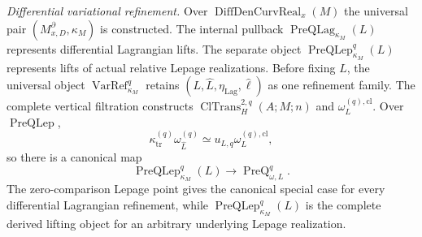 \begin{theorem}
\medskip
\noindent\emph{Differential variational refinement.}
Over $\operatorname{DiffDenCurvReal}_x(M)$ the universal pair
$(M^\partial_{x,D},\kappa_M)$ is constructed.  The internal pullback
$\operatorname{PreQLag}_{\kappa_M}(L)$ represents differential Lagrangian lifts.
The separate object $\operatorname{PreQLep}_{\kappa_M}^{q}(L)$ represents lifts
of actual relative Lepage realizations.  Before fixing $L$, the universal object
$\operatorname{VarRef}_{\kappa_M}^{q}$ retains
$(L,\widehat L,\eta_{\mathrm{Lag}},\widehat\ell)$ as one refinement family.  The complete vertical filtration
constructs
$\operatorname{ClTrans}^{2,q}_H(A;M;n)$ and
$\omega_L^{(q),\mathrm{cl}}$.  Over $\operatorname{PreQLep}$,
\[
\kappa_{\mathrm{tr}}^{(q)}\omega_{\widehat L}^{(q)}
\simeq
u_{L,q}\omega_L^{(q),\mathrm{cl}},
\]
so there is a canonical map
\[
\boxed{
\operatorname{PreQLep}_{\kappa_M}^{q}(L)
\longrightarrow
\operatorname{PreQ}_{\omega,L}^{q}.
}
\]
The zero-comparison Lepage point gives the canonical special case for every
differential Lagrangian refinement, while
$\operatorname{PreQLep}_{\kappa_M}^{q}(L)$ is the complete derived lifting object
for an arbitrary underlying Lepage realization.


\end{theorem}
